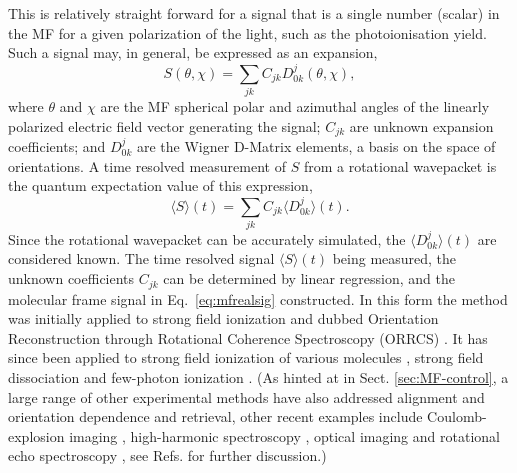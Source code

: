\documentclass[10pt]{article}
\begin{document}
This is relatively straight forward for a signal that is a single number (scalar) in the MF for a given polarization of the light, such as the photoionisation yield. Such a signal may, in general, be expressed as an expansion,
\begin{equation}
S(\theta,\chi)=\sum_{jk}C_{jk}D^{j}_{0k}(\theta,\chi),
\label{eq:mfrealsig}
\end{equation}
where $\theta$ and $\chi$ are the MF spherical polar and azimuthal angles of the linearly polarized electric field vector generating the signal; $C_{jk}$ are unknown expansion coefficients; and $D^{j}_{0k}$ are the Wigner D-Matrix elements, a basis on the space of orientations. A time resolved measurement of $S$ from a rotational wavepacket is the quantum expectation value of this expression,
\begin{equation}
\langle S \rangle(t) = \sum_{jk}C_{jk}\langle D^{j}_{0k} \rangle (t).
\label{eq:St-Cjk}
\end{equation}
Since the rotational wavepacket can be accurately simulated, the $\langle D^{j}_{0k} \rangle (t)$ are considered known. The time resolved signal $\langle S \rangle(t)$ being measured, the unknown coefficients $C_{jk}$ can be determined by linear regression, and the molecular frame signal in Eq.~\ref{eq:mfrealsig} constructed. In this form the method was initially applied to strong field ionization and dubbed Orientation Reconstruction through Rotational Coherence Spectroscopy (ORRCS) \cite{makhija2016ORRCS,wang2017ORRCS}.
It has since been applied to strong field ionization of various molecules \cite{sandor2018ORRCS,sandor2019ORRCS,wangjam2021ORRCS},
strong field dissociation \cite{lam2020ORRCS} 
and few-photon ionization \cite{lam2022ORRCS}. 
(As hinted at in Sect. \ref{sec:MF-control}, a large range of other experimental methods have also addressed alignment and orientation dependence and retrieval, other recent examples include Coulomb-explosion imaging \cite{Underwood2015}, high-harmonic spectroscopy \cite{he2018RealTimeObservationMolecular, he2020MeasuringRotationalTemperature}, optical imaging \cite{Loriot2008} and rotational echo spectroscopy \cite{wang2022RotationalEchoSpectroscopy}, see Refs. \cite{Ramakrishna2013,koch2019QuantumControlMolecular} for further discussion.)
\end{document}
